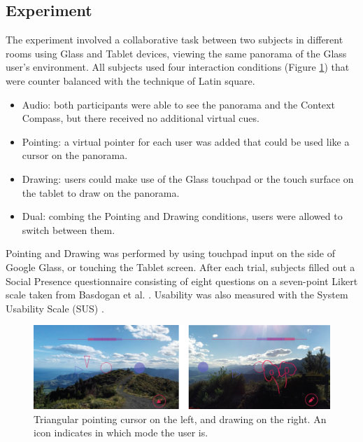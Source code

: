 \subsection{Experiment}

The experiment involved a collaborative task between two subjects in different rooms using Glass and Tablet devices, viewing the same panorama of the Glass user's environment. All subjects used four interaction conditions (Figure \ref{fig:ismar14:pointing-drawing}) that were counter balanced with the technique of Latin square.

\begin{itemize}
    \item Audio: both participants were able to see the panorama and the Context Compass, but there received no additional virtual cues. 
    \item Pointing: a virtual pointer for each user was added that could be used like a cursor on the panorama.
    \item Drawing: users could make use of the Glass touchpad or the touch surface on the tablet to draw on the panorama. 
    \item Dual: combing the Pointing and Drawing conditions, users were allowed to switch between them.
\end{itemize}{}

Pointing and Drawing was performed by using touchpad input on the side of Google Glass, or touching the Tablet screen. After each trial, subjects filled out a Social Presence questionnaire consisting of eight questions on a seven-point Likert scale taken from Basdogan et al. \cite{Basdogan2001}. Usability was also measured with the System Usability Scale (SUS) \cite{brooke1996sus}.

\begin{figure}[ht]
	\centering
	\includegraphics[width=\linewidth]{images/ismar14/pointing-drawing}
	\caption{Triangular pointing cursor on the left, and drawing on the right. An icon indicates in which mode the user is.}
	\label{fig:ismar14:pointing-drawing}
\end{figure}

